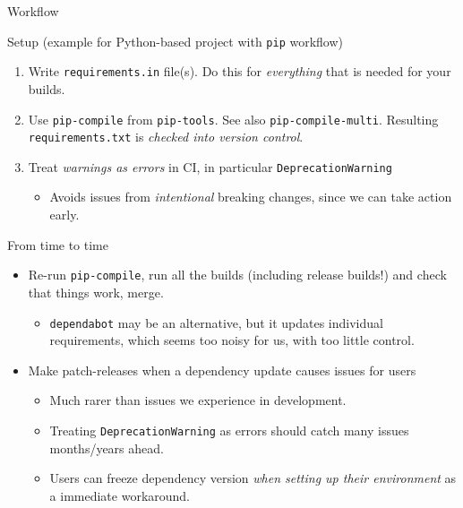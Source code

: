 \documentclass[english,aspectratio=1610,smaller]{beamer}
\begin{document}
\begin{frame}{Workflow}
  \begin{block}{Setup (example for Python-based project with \texttt{pip} workflow)}
    \begin{enumerate}
      \item Write \texttt{requirements.in} file(s).
        Do this for \emph{everything} that is needed for your builds.
      \item Use \texttt{pip-compile} from \texttt{pip-tools}. See also \texttt{pip-compile-multi}.
        Resulting \texttt{requirements.txt} is \emph{checked into version control}.
      \item Treat \emph{warnings as errors} in CI, in particular \texttt{DeprecationWarning}
        \begin{itemize}
          \item Avoids issues from \emph{intentional} breaking changes, since we can take action early.
        \end{itemize}
    \end{enumerate}
  \end{block}
  \begin{block}{From time to time}
    \begin{itemize}
      \item Re-run \texttt{pip-compile}, run all the builds (including release builds!) and check that things work, merge.
        \begin{itemize}
          \item \texttt{dependabot} may be an alternative, but it updates individual requirements, which seems too noisy for us, with too little control.
        \end{itemize}
      \item Make patch-releases when a dependency update causes issues for users
        \begin{itemize}
          \item Much rarer than issues we experience in development.
          \item Treating \texttt{DeprecationWarning} as errors should catch many issues months/years ahead.
          \item Users can freeze dependency version \emph{when setting up their environment} as a immediate workaround.
        \end{itemize}
    \end{itemize}
  \end{block}
\end{frame}
\end{document}
